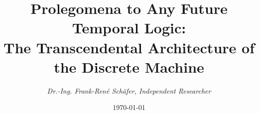 \documentclass[11pt, a4paper]{article}
\title{\textbf{Prolegomena to Any Future Temporal Logic}: \\ \large The Transcendental Architecture of the Discrete Machine}
\author{\textit{Dr.-Ing. Frank-René Schäfer, Independent Researcher}}
\date{\today}
\theoremstyle{formalism}
\begin{document}
\maketitle

\begin{abstract} 



\end{abstract}
\end{document}
